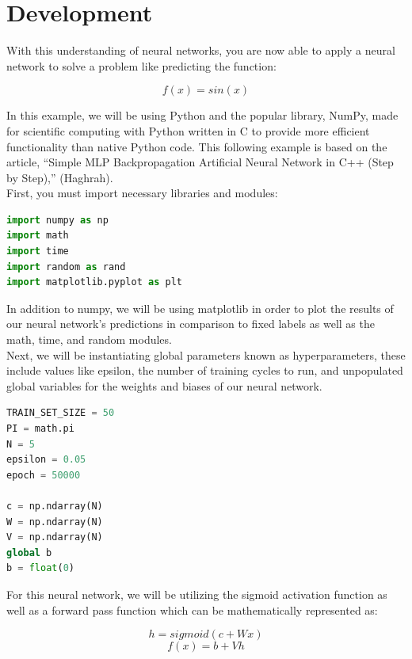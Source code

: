 \documentclass[12pt, letter]{article}
\begin{document}
\section{Development}

With this understanding of neural networks, you are now able to apply a neural network to solve a problem like predicting the function:

\begin{equation}
f(x) = sin(x)
\end{equation}
	
 
\noindent In this example, we will be using Python and the popular library, NumPy, made for scientific computing with Python written in C to provide more efficient functionality than native Python code. This following example is based on the article, “Simple MLP Backpropagation Artificial Neural Network in C++ (Step by Step),” (Haghrah). \\

First, you must import necessary libraries and modules:


\begin{lstlisting}[language=Python]
import numpy as np
import math
import time 
import random as rand
import matplotlib.pyplot as plt
\end{lstlisting}

\noindent In addition to numpy, we will be using matplotlib in order to plot the results of our neural network’s predictions in comparison to fixed labels as well as the math, time, and random modules.\\

Next, we will be instantiating global parameters known as hyperparameters, these include values like epsilon, the number of training cycles to run, and unpopulated global variables for the weights and biases of our neural network. 

\begin{lstlisting}[language=Python]
TRAIN_SET_SIZE = 50
PI = math.pi
N = 5
epsilon = 0.05
epoch = 50000

c = np.ndarray(N)
W = np.ndarray(N)
V = np.ndarray(N)
global b 
b = float(0)
\end{lstlisting}

For this neural network, we will be utilizing the sigmoid activation function as well as a forward pass function which can be mathematically represented as:

\begin{equation}
h=sigmoid(c+Wx)
\end{equation}
\begin{equation}
f(x)=b+Vh
\end{equation}
	
\end{document}
